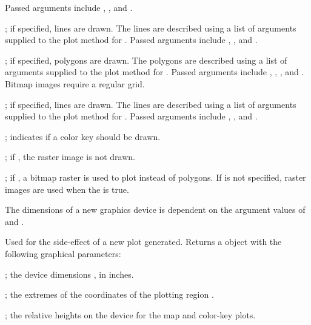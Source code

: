 \documentclass[letterpaper]{book}
\begin{document}
\begin{Arguments}
\begin{ldescription}
Passed arguments include , , and .
\item[\code{rivers}] ; if specified, lines are drawn.
The lines are described using a list of arguments supplied to the plot method for .
Passed arguments include , , and .
\item[\code{lakes}] ; if specified, polygons are drawn.
The polygons are described using a list of arguments supplied to the plot method for .
Passed arguments include , , , and .
Bitmap images require a regular grid.
\item[\code{roads}] ; if specified, lines are drawn.
The lines are described using a list of arguments supplied to the plot method for .
Passed arguments include , , and .
\item[\code{draw.key}] ; indicates if a color key should be drawn.
\item[\code{draw.raster}] ; if , the raster image is not drawn.
\item[\code{useRaster}] ; if , a bitmap raster is used to plot  instead of polygons.
If  is not specified, raster images are used when the  is true.
\end{ldescription}
\end{Arguments}
%
\begin{Details}\relax
The dimensions of a new graphics device is dependent on the argument values of  and .
\end{Details}
%
\begin{Value}
Used for the side-effect of a new plot generated.
Returns a  object with the following graphical parameters:
\begin{ldescription}
\item[\code{din}] ; the device dimensions , in inches.
\item[\code{usr}] ; the extremes of the coordinates of the plotting region .
\item[\code{heights}] ; the relative heights on the device  for the map and color-key plots.
\end{ldescription}
\end{Value}
\end{document}
